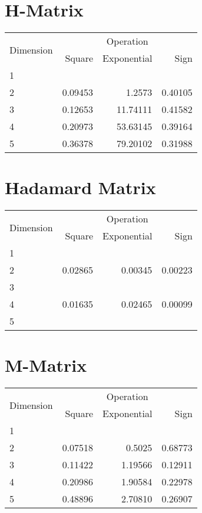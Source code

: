 \documentclass{article}
\begin{document}
\section{H-Matrix}
\begin{tabular}{@{}lrrr@{}}
\toprule
\multirow{2}{*}{Dimension} & \multicolumn{3}{c}{Operation} \\
\cmidrule(l){2-4}
& Square & Exponential & Sign \\
\midrule
1 & & & \\
2 & 0.09453 & 1.2573 & 0.40105 \\
3 & 0.12653 & 11.74111 & 0.41582 \\
4 & 0.20973 & 53.63145 & 0.39164 \\
5 & 0.36378 & 79.20102 & 0.31988 \\
\bottomrule
\end{tabular}

\section{Hadamard Matrix}
\begin{tabular}{@{}lrrr@{}}
\toprule
\multirow{2}{*}{Dimension} & \multicolumn{3}{c}{Operation} \\
\cmidrule(l){2-4}
& Square & Exponential & Sign \\
\midrule
1 & & & \\
2 & 0.02865 & 0.00345 & 0.00223 \\
3 & & & \\
4 & 0.01635 & 0.02465 & 0.00099 \\
5 & & & \\
\bottomrule
\end{tabular}

\section{M-Matrix}
\begin{tabular}{@{}lrrr@{}}
\toprule
\multirow{2}{*}{Dimension} & \multicolumn{3}{c}{Operation} \\
\cmidrule(l){2-4}
& Square & Exponential & Sign \\
\midrule
1 & & & \\
2 & 0.07518 & 0.5025 & 0.68773 \\
3 & 0.11422 & 1.19566 & 0.12911 \\
4 & 0.20986 & 1.90584 & 0.22978 \\
5 & 0.48896 & 2.70810 & 0.26907 \\
\bottomrule
\end{tabular}
\end{document}
